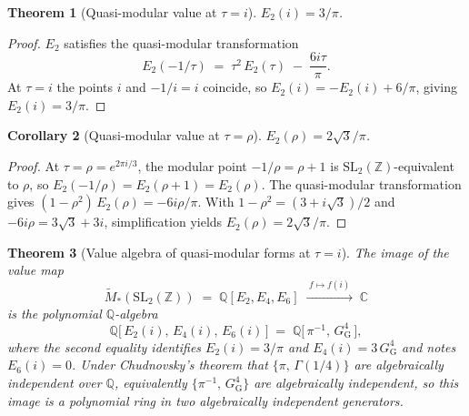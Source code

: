 \documentclass[11pt]{article}
\newtheorem{theorem}{Theorem}[section]
\newtheorem{corollary}[theorem]{Corollary}
\theoremstyle{definition}
\theoremstyle{remark}
\newcommand{\GG}{G_{\!\scriptscriptstyle\mathrm{G}}}
\newcommand{\Z}{\mathbb{Z}}
\newcommand{\Q}{\mathbb{Q}}
\newcommand{\C}{\mathbb{C}}
\begin{document}
\begin{theorem}[Quasi-modular value at $\tau = i$]\label{thm:E2-pi}
$E_2(i) = 3/\pi$.
\end{theorem}

\begin{proof}
$E_2$ satisfies the quasi-modular transformation \cite[\S5.3]{diamondshurman}
\[
E_2(-1/\tau) \;=\; \tau^2\,E_2(\tau) \;-\; \frac{6 i\tau}{\pi}.
\]
At $\tau = i$ the points $i$ and $-1/i = i$ coincide, so
$E_2(i) = -E_2(i) + 6/\pi$, giving $E_2(i) = 3/\pi$.
\end{proof}

\begin{corollary}[Quasi-modular value at $\tau = \rho$]\label{cor:E2-rho}
$E_2(\rho) = 2\sqrt{3}/\pi$.
\end{corollary}

\begin{proof}
At $\tau = \rho = e^{2\pi i/3}$, the modular point $-1/\rho = \rho + 1$ is
$\mathrm{SL}_2(\Z)$-equivalent to $\rho$, so $E_2(-1/\rho) = E_2(\rho + 1) = E_2(\rho)$.
The quasi-modular transformation gives
$(1 - \rho^2)\,E_2(\rho) = -6i\rho/\pi$. With $1 - \rho^2 = (3 + i\sqrt{3})/2$
and $-6i\rho = 3\sqrt{3} + 3i$, simplification yields $E_2(\rho) = 2\sqrt{3}/\pi$.
\end{proof}

\begin{theorem}[Value algebra of quasi-modular forms at $\tau = i$]\label{thm:QM-algebra}
The image of the value map
\[
\widetilde{M}_*(\mathrm{SL}_2(\Z)) \;=\; \Q[E_2, E_4, E_6] \;\xrightarrow{\;f \mapsto f(i)\;}\; \C
\]
is the polynomial $\Q$-algebra
\[
\Q\bigl[\,E_2(i),\, E_4(i),\, E_6(i)\,\bigr] \;=\; \Q\bigl[\,\pi^{-1},\, \GG^{4}\,\bigr],
\]
where the second equality identifies $E_2(i) = 3/\pi$ and $E_4(i) = 3\,\GG^4$ and
notes $E_6(i) = 0$. Under Chudnovsky's theorem that
$\{\pi,\,\Gamma(1/4)\}$ are algebraically independent over $\Q$, equivalently
$\{\pi^{-1},\,\GG^4\}$ are algebraically independent, so this image is a
\emph{polynomial} ring in two algebraically independent generators.
\end{theorem}
\end{document}
